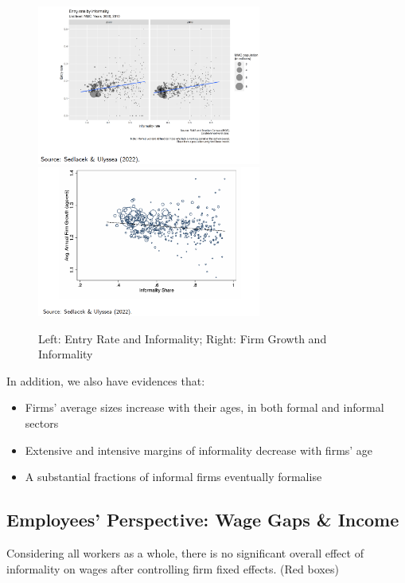                 \begin{figure}[H]
                    \centering
                    \includegraphics[width=2.9in]{images/ch5/dynamics_2.png}
                    \includegraphics[width=2.9in]{images/ch5/dynamics_3.png}
                    \caption{Left: Entry Rate and Informality; Right: Firm Growth and Informality}
                \end{figure}
                In addition, we also have evidences that:
                \begin{itemize}
                    \item Firms' average sizes increase with their ages, in both formal and informal sectors
                    \item Extensive and intensive margins of informality decrease with firms' age
                    \item A substantial fractions of informal firms eventually formalise
                \end{itemize}
                
            \subsection{Employees' Perspective: Wage Gaps \& Income}
                Considering all workers as a whole, there is no significant overall effect of informality on wages after controlling firm fixed effects. (Red boxes)
                
